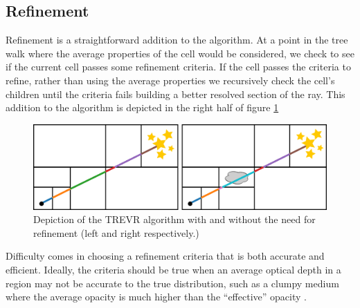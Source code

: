 \documentclass[fleqn,usenatbib]{mnras}
\newcommand{\acro}{TREVR}
\begin{document}
\subsection{Refinement}
Refinement is a straightforward addition to the algorithm. At a point in the 
tree walk where the average properties of the cell would be considered, we 
check to see if the current cell passes some refinement criteria. If the cell 
passes the criteria to refine, rather than using the average properties we 
recursively check the cell's children until the criteria fails building a 
better resolved  section of the ray. This addition to the algorithm is depicted
 in the right half of figure \ref{fig:tree}
\begin{figure}
\includegraphics[width=1\linewidth]{Figures/algorithm.png}
\caption{Depiction of the \acro{} algorithm with and without the need for 
refinement (left and right respectively.)}
\label{fig:tree}
\end{figure}

Difficulty comes in choosing a refinement criteria that is both accurate and 
efficient. Ideally, the criteria should be true when an average optical depth 
in a region may not be accurate to the true distribution, such as a clumpy 
medium where the average opacity is much higher than the ``effective'' opacity
 \citep{hegmanKegel03,varosiDwek99}.
\end{document}
